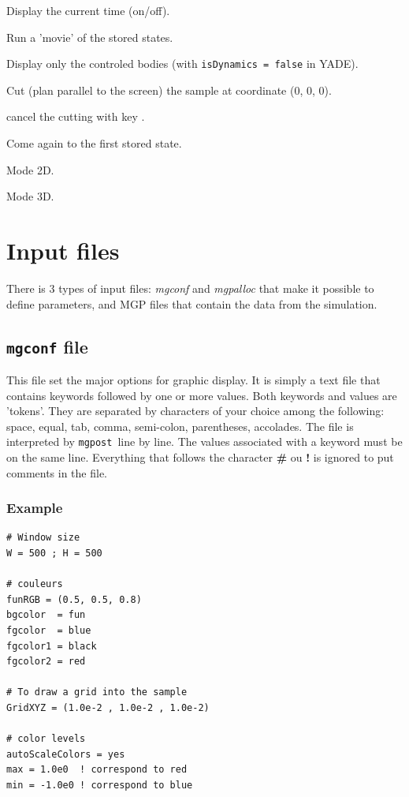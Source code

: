 \documentclass{simpledoc}
\newcommand{\mgpost}{\texttt{mgpost}\ }
\newcommand{\file}[1]{\textit{#1}}
\newcommand{\screen}[1]{\texttt{#1}}
\newcommand{\key}[1]{\fbox{#1}}
\begin{document}
\marginlabel{\key{t}}
Display the current time (on/off).

\marginlabel{\key{w}}
Run a 'movie' of the stored states.

\marginlabel{\key{z}}
Display only the controled bodies (with \screen{isDynamics = false} in YADE).

\marginlabel{\key{/}}
Cut (plan parallel to the screen) the sample at coordinate (0, 0, 0).

\marginlabel{\key{*}}
cancel the cutting with key \key{/}.

\marginlabel{\key{0}}
Come again to the first stored state.

\marginlabel{\key{2}}
Mode 2D.

\marginlabel{\key{3}}
Mode 3D.

\section {Input files}

There is 3 types of input files: \file{mgconf} and \file{mgpalloc} that make it possible to define parameters, and MGP files that contain the data from the simulation.

\subsection{\screen{mgconf} file}
        
This file set the major options for graphic display. It is simply a
text file that contains keywords followed by one or more values.
Both keywords and values are 'tokens'. They are separated by characters of your choice among the following:
space, equal, tab, comma, semi-colon, parentheses, accolades.
The file is interpreted by \mgpost line by line.
The values associated with a keyword must be on the same line.
Everything that follows the character \textbf{\#} ou \textbf{!} is ignored to put comments in the file.

\subsubsection{Example}

\begin{lstlisting}[style=mgpdata]
# Window size
W = 500 ; H = 500 

# couleurs
funRGB = (0.5, 0.5, 0.8)
bgcolor  = fun 
fgcolor  = blue
fgcolor1 = black
fgcolor2 = red

# To draw a grid into the sample
GridXYZ = (1.0e-2 , 1.0e-2 , 1.0e-2)

# color levels
autoScaleColors = yes
max = 1.0e0  ! correspond to red
min = -1.0e0 ! correspond to blue
\end{lstlisting}
\end{document}
